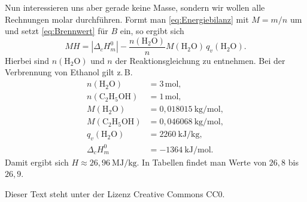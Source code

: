 \documentclass[a4paper,11pt,fleqn,twocolumn]{article}
\newcommand{\unit}[1]{\mathrm{#1}}
\begin{document}
Nun interessieren uns aber gerade keine Masse, sondern wir wollen
alle Rechnungen molar durchführen. Formt man
\eqref{eq:Energiebilanz} mit $M=m/n$ um und setzt \eqref{eq:Brennwert}
für $B$ ein, so ergibt sich
\begin{equation}
MH = |\Delta_c H_m^0| - \frac{n(\mathrm{H_2O})}{n}
M(\mathrm{H_2O})\,q_v(\mathrm{H_2O}).
\end{equation}
Hierbei sind $n(\mathrm{H_2O})$ und $n$ der Reaktionsgleichung
zu entnehmen.
Bei der Verbrennung von Ethanol gilt z.\,B.
\[\begin{split}
n(\mathrm{H_2O}) &= 3\,\unit{mol},\\
n(\mathrm{C_2H_5OH}) &= 1\,\unit{mol},\\
M(\mathrm{H_2O}) &= 0{,}018015\:\unit{kg/mol},\\
M(\mathrm{C_2H_5OH}) &= 0{,}046068\:\unit{kg/mol},\\
q_v(\mathrm{H_2O}) &= 2260\:\unit{kJ/kg},\\
\Delta_c H_m^0 &= -1364\:\unit{kJ/mol}.
\end{split}
\]
Damit ergibt sich $H\approx 26{,}96\:\unit{MJ/kg}$.
In Tabellen findet man Werte von $26{,}8$ bis $26{,}9$.

\vfill

\noindent
{\small Dieser Text steht unter der Lizenz Creative Commons CC0.}
\end{document}
